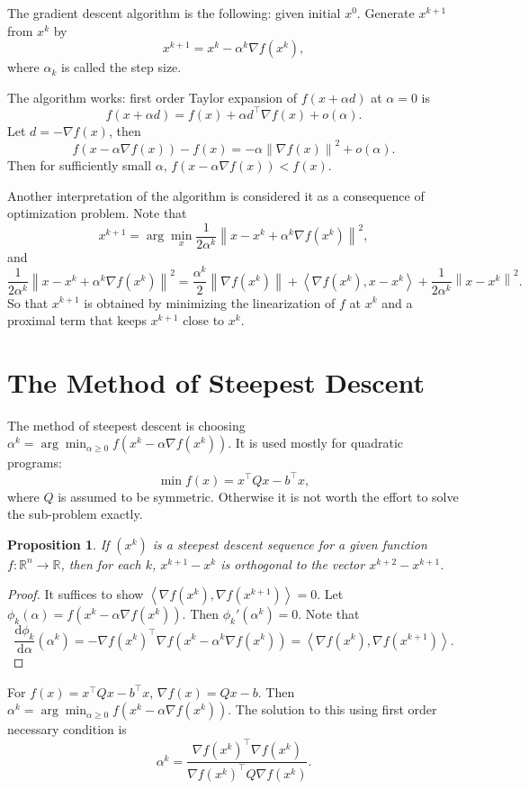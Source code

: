 \documentclass[12pt,a4paper]{report}
\numberwithin{equation}{section}
\theoremstyle{mystyle}
\newtheorem{proposition}[definition]{Proposition}
\newcommand{\R}{\mathbb{R}}
\newcommand{\grad}{\nabla}
\renewcommand{\d}{\mathrm{d}}
\newcommand{\T}{\top}
\newcommand{\norm}[1]{\left\lVert #1 \right\rVert}
\newcommand{\inner}[1]{\left\langle #1 \right\rangle}
\begin{document}
	The gradient descent algorithm is the following: given initial $x^{0}$. Generate $x^{k+1}$ from $x^k$ by 
	$$
	x^{k+1}=x^k - \alpha^k \grad f(x^k),
	$$
	where $\alpha_k$ is called the step size.
	
	The algorithm works: first order Taylor expansion of $f(x+\alpha d)$ at $\alpha=0$ is
	$$
	f(x+\alpha d)=f(x)+\alpha d^\T \grad f(x)+ o(\alpha).
	$$
	Let $d=-\grad f(x)$, then
	$$
	f(x-\alpha \grad f(x))-f(x)=-\alpha \norm{\grad f(x)}^2+o(\alpha).
	$$
	Then for sufficiently small $\alpha$, $f(x-\alpha \grad f(x))<f(x)$.
	
	Another interpretation of the algorithm is considered it as a consequence of optimization problem. Note that
	$$
	x^{k+1}=\arg\min_x \frac{1}{2\alpha^k}\norm{x-x^k +\alpha^k \grad f(x^k)}^2,
	$$
	and
	$$
	\frac{1}{2\alpha^k}\norm{x-x^k +\alpha^k \grad f(x^k)}^2
	=
	\frac{\alpha^k}{2} \norm{\grad f(x^k)} + \inner{\grad f(x^k), x-x^k}+\frac{1}{2\alpha^k}\norm{x-x^k}^2.
	$$
	So that $x^{k+1}$ is obtained by minimizing the linearization of $f$ at $x^k$ and a proximal term that keeps $x^{k+1}$ close to $x^k$.

	\section{The Method of Steepest Descent}
	The method of steepest descent is choosing $\alpha^k=\arg\min_{\alpha\geq 0} f(x^k-\alpha \grad f(x^k))$. It is used mostly for quadratic programs:
	\begin{equation}
			\min f(x)=x^\T Q x-b^\T x,
	\end{equation}
	where $Q$ is assumed to be symmetric.
	Otherwise it is not worth the effort to solve the sub-problem exactly.
	
	\begin{proposition}
		If $(x^k)$ is a steepest descent sequence for a given function $f:\R^n \to \R$, then for each $k$, $x^{k+1}-x^k$ is orthogonal to the vector $x^{k+2}-x^{k+1}$.
	\end{proposition}
	\begin{proof}
		It suffices to show $\inner{\grad f(x^k),\grad f(x^{k+1})}=0$. Let $\phi_k(\alpha)=f(x^k-\alpha \grad f(x^k))$. Then $\phi_k'(\alpha^k)=0$. Note that 
		$$
		\frac{\d \phi_k}{\d \alpha}(\alpha^k)= - \grad f(x^k)^\T \grad f(x^k-\alpha^k \grad f(x^k))=\inner{\grad f(x^k),\grad f(x^{k+1})}.
		$$
	\end{proof}
	
	For $f(x)=x^\T Q x-b^\T x$, $\grad f(x)=Qx-b$. Then $\alpha^k=\arg\min_{\alpha\geq 0} f(x^k-\alpha\grad f(x^k))$. The solution to this using first order necessary condition is
	$$
	\alpha^k =\frac{\grad f(x^k)^\T \grad f(x^k)}{\grad f(x^k)^\T Q \grad f(x^k)}.
	$$
	
\end{document}
